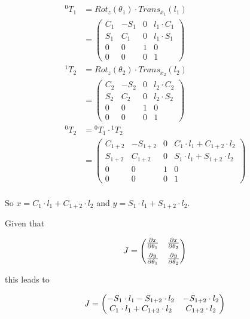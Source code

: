 \documentclass[a4paper,11pt]{article}
\begin{document}
\begin {enumerate}
\begin{enumerate}
				\begin{align*}
					{^0T_1} &= Rot_{z}(\theta_1) \cdot Trans_{x_1}(l_1)\\
					&= \begin{pmatrix}
						C_1 & -S_1 & 0 & l_1 \cdot C_1\\
						S_1 & C_1 & 0 & l_1 \cdot S_1\\
						0 & 0 & 1 & 0\\
						0 & 0 & 0 & 1
					\end{pmatrix}\\
					{^1T_2} &= Rot_{z}(\theta_2) \cdot Trans_{x_2}(l_2)\\
					&= \begin{pmatrix}
						C_2 & -S_2 & 0 & l_2 \cdot C_2\\
						S_2 & C_2 & 0 & l_2 \cdot S_2\\
						0 & 0 & 1 & 0\\
						0 & 0 & 0 & 1
					\end{pmatrix}\\
					{^0T_2} &= {^0T_1} \cdot {^1T_2}\\
					&= \begin{pmatrix}
						C_{1+2} & -S_{1+2} & 0 & C_1 \cdot l_1 + C_{1+2} \cdot l_2 \\
						S_{1+2} & C_{1+2} & 0 & S_1 \cdot l_1 + S_{1+2} \cdot l_2 \\
						0 & 0 & 1 & 0\\
						0 & 0 & 0 & 1
					\end{pmatrix}\\
				\end{align*}

				So $x = C_1 \cdot l_1 + C_{1+2} \cdot l_2$ and $y = S_1 \cdot l_1 + S_{1+2} \cdot l_2$.

				Given that

				$$J = \begin{pmatrix}
					\frac{\partial x}{\partial \theta_1} & \frac{\partial x}{\partial \theta_2} \\[6pt]
					\frac{\partial y}{\partial \theta_1} & \frac{\partial y}{\partial \theta_2}
				\end{pmatrix} \\$$

				this leads to

				$$J = \begin{pmatrix}
					-S_1 \cdot l_1 - S_{1+2} \cdot l_2 & -S_{1+2} \cdot l_2 \\
					C_1 \cdot l_1 + C_{1+2} \cdot l_2 & C_{1+2} \cdot l_2 \\
				\end{pmatrix} \\$$


\end{enumerate}
\end{enumerate}
\end{document}
